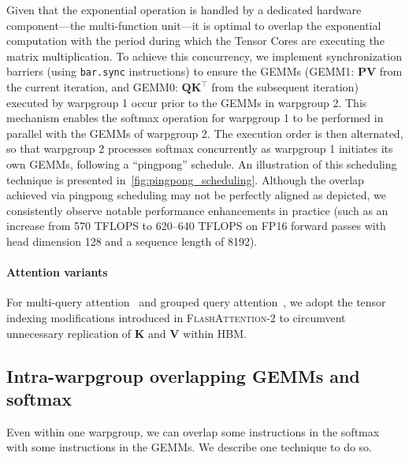 Given that the exponential operation is handled by a dedicated hardware component—the multi-function unit—it is optimal to overlap the exponential computation with the period during which the Tensor Cores are executing the matrix multiplication. To achieve this concurrency, we implement synchronization barriers (using \texttt{bar.sync} instructions) to ensure the GEMMs (GEMM1: $\mathbf{P} \mathbf{V}$ from the current iteration, and GEMM0: $\mathbf{Q} \mathbf{K}^\top$ from the subsequent iteration) executed by warpgroup 1 occur prior to the GEMMs in warpgroup 2. This mechanism enables the softmax operation for warpgroup 1 to be performed in parallel with the GEMMs of warpgroup 2. The execution order is then alternated, so that warpgroup 2 processes softmax concurrently as warpgroup 1 initiates its own GEMMs, following a ``pingpong'' schedule. An illustration of this scheduling technique is presented in~\cref{fig:pingpong_scheduling}. Although the overlap achieved via pingpong scheduling may not be perfectly aligned as depicted, we consistently observe notable performance enhancements in practice (such as an increase from 570 TFLOPS to 620–640 TFLOPS on FP16 forward passes with head dimension 128 and a sequence length of 8192).

\paragraph{Attention variants} For multi-query attention~\citep{shazeer2019fast} and grouped query attention~\citep{ainslie2023gqa}, we adopt the tensor indexing modifications introduced in \textsc{FlashAttention-2} to circumvent unnecessary replication of $\mathbf{K}$ and $\mathbf{V}$ within HBM.

\subsection{Intra-warpgroup overlapping GEMMs and softmax}

Even within one warpgroup, we can overlap some instructions in the softmax with some instructions in the GEMMs. We describe one technique to do so.

